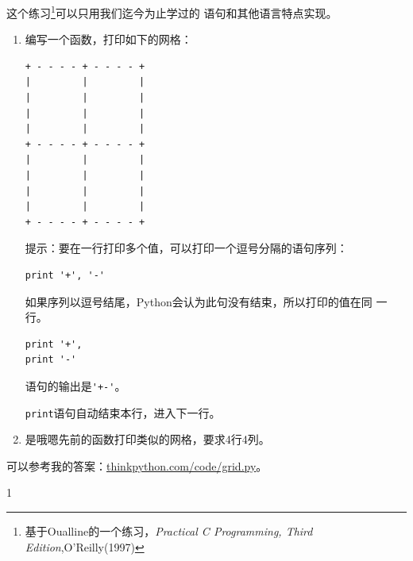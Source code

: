 \begin{ex}

这个练习\footnote{基于Oualline的一个练习，{\em Practical C Programming, Third Edition},O'Reilly(1997)}可以只用我们迄今为止学过的
语句和其他语言特点实现。


\begin{enumerate}

\item 编写一个函数，打印如下的网格：

\beforeverb
\begin{verbatim}
+ - - - - + - - - - +
|         |         |
|         |         |
|         |         |
|         |         |
+ - - - - + - - - - +
|         |         |
|         |         |
|         |         |
|         |         |
+ - - - - + - - - - +
\end{verbatim}
\afterverb

提示：要在一行打印多个值，可以打印一个逗号分隔的语句序列：

\beforeverb
\begin{verbatim}
print '+', '-'
\end{verbatim}
\afterverb
%

如果序列以逗号结尾，Python会认为此句没有结束，所以打印的值在同
一行。
\beforeverb
\begin{verbatim}
print '+', 
print '-'
\end{verbatim}
\afterverb
%

语句的输出是\verb"'+-'"。


{\tt print}语句自动结束本行，进入下一行。

\item 是哦嗯先前的函数打印类似的网格，要求4行4列。

\end{enumerate}

可以参考我的答案：\url{thinkpython.com/code/grid.py}。

\end{ex}















































1


